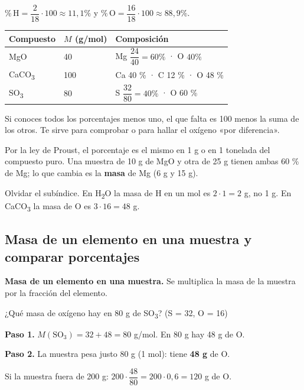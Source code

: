  

$\%\,\text{H} = \dfrac{2}{18}\cdot 100 \approx 11{,}1\%$ y $\%\,\text{O} = \dfrac{16}{18}\cdot 100 \approx 88{,}9\%$.

 
\begin{center}\small
\begin{tabular}{@{}lll@{}}
\toprule
\textbf{Compuesto} & \textbf{$M$ (g/mol)} & \textbf{Composición} \\
\midrule
MgO & 40 & Mg $\dfrac{24}{40} = 60\%$ · O $40\%$ \\
CaCO\textsubscript{3} & 100 & Ca 40 \% · C 12 \% · O 48 \% \\
SO\textsubscript{3} & 80 & S $\dfrac{32}{80} = 40\%$ · O 60 \% \\
\bottomrule
\end{tabular}
\end{center}
  
\begin{clave} Si conoces todos los porcentajes menos uno, el que falta es 100 menos la suma de los otros. Te sirve para comprobar o para hallar el oxígeno «por diferencia».\end{clave}
 
\begin{clave} Por la ley de Proust, el porcentaje es el mismo en 1 g o en 1 tonelada del compuesto puro. Una muestra de 10 g de MgO y otra de 25 g tienen ambas 60 \% de Mg; lo que cambia es la \textbf{masa} de Mg (6 g y 15 g).\end{clave}
 
\begin{ojo} Olvidar el subíndice. En H\textsubscript{2}O la masa de H en un mol es $2\cdot 1 = 2$ g, no 1 g. En CaCO\textsubscript{3} la masa de O es $3\cdot 16 = 48$ g.\end{ojo}
\subsection{Masa de un elemento en una muestra y comparar porcentajes}
\textbf{Masa de un elemento en una muestra.} Se multiplica la masa de la muestra por la fracción del elemento.

 
\begin{ejemplo} ¿Qué masa de oxígeno hay en 80 g de SO\textsubscript{3}? (S = 32, O = 16)\par \textbf{Paso 1.} $M(\text{SO}_3) = 32 + 48 = 80$ g/mol. En 80 g hay 48 g de O.\par \textbf{Paso 2.} La muestra pesa justo 80 g (1 mol): tiene \textbf{48 g} de O.\par Si la muestra fuera de 200 g: $200\cdot\dfrac{48}{80} = 200\cdot 0{,}6 = 120$ g de O.\end{ejemplo}
 

